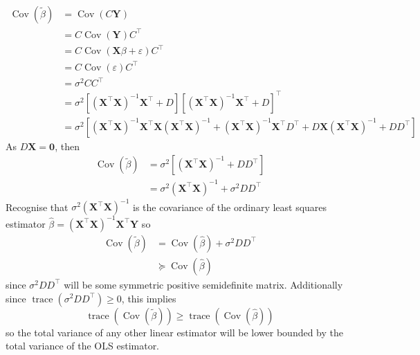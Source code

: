 \documentclass[11pt]{report} %
\begin{document}
\begin{align}
\operatorname{Cov}\left(\widetilde{\beta}\right) &= \operatorname{Cov}\left(C\mathbf{Y}\right) \\
&= C\operatorname{Cov}\left(\mathbf{Y}\right)C^{\top} \\
&= C\operatorname{Cov}\left(\mathbf{X}\beta + \varepsilon\right)C^{\top} \\
&= C\operatorname{Cov}\left(\varepsilon\right)C^{\top} \\
&= \sigma^{2}CC^{\top} \\
&= \sigma^{2}\left[\left(\mathbf{X}^{\top}\mathbf{X}\right)^{-1}\mathbf{X}^{\top} + D\right]\left[\left(\mathbf{X}^{\top}\mathbf{X}\right)^{-1}\mathbf{X}^{\top} + D\right]^{\top} \\
&= \sigma^{2}\left[\left(\mathbf{X}^{\top}\mathbf{X}\right)^{-1}\mathbf{X}^{\top}\mathbf{X}\left(\mathbf{X}^{\top}\mathbf{X}\right)^{-1} + \left(\mathbf{X}^{\top}\mathbf{X}\right)^{-1}\mathbf{X}^{\top}D^{\top} + D\mathbf{X}\left(\mathbf{X}^{\top}\mathbf{X}\right)^{-1} + DD^{\top}\right]
\end{align}
As $D\mathbf{X} = \mathbf{0}$, then
\begin{align}
\operatorname{Cov}\left(\widetilde{\beta}\right) &= \sigma^{2}\left[\left(\mathbf{X}^{\top}\mathbf{X}\right)^{-1}  + DD^{\top}\right] \\
&= \sigma^{2}\left(\mathbf{X}^{\top}\mathbf{X}\right)^{-1} + \sigma^{2}DD^{\top}
\end{align}
Recognise that $\sigma^{2}\left(\mathbf{X}^{\top}\mathbf{X}\right)^{-1}$ is the covariance of the ordinary least squares estimator $\widehat{\beta} = \left(\mathbf{X}^{\top}\mathbf{X}\right)^{-1}\mathbf{X}^{\top}\mathbf{Y}$ so
\begin{align}
\operatorname{Cov}\left(\widetilde{\beta}\right) &= \operatorname{Cov}\left(\widehat{\beta}\right) + \sigma^{2}DD^{\top} \\
&\succeq \operatorname{Cov}\left(\widehat{\beta}\right)
\end{align}
since $\sigma^{2}DD^{\top}$ will be some symmetric positive semidefinite matrix. Additionally since $\operatorname{trace}\left(\sigma^{2}DD^{\top}\right) \geq 0$, this implies
\begin{equation}
\operatorname{trace}\left(\operatorname{Cov}\left(\widetilde{\beta}\right)\right) \geq \operatorname{trace}\left(\operatorname{Cov}\left(\widehat{\beta}\right)\right)
\end{equation}
so the total variance of any other linear estimator will be lower bounded by the total variance of the OLS estimator.
\end{document}
